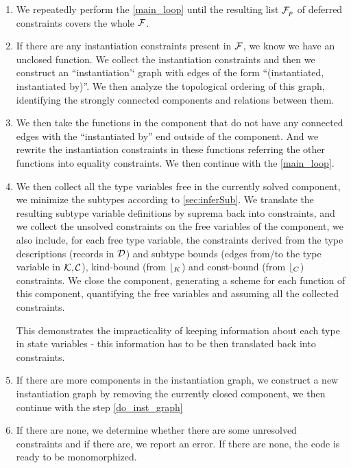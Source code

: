 \begin{enumerate}
    \item We repeatedly perform the \cref{main_loop} until the resulting list $\mathcal F_p$ of deferred constraints covers the whole $\mathcal{F}$.

    \item If there are any instantiation constraints present in $\mathcal F$, we know we have an unclosed function. We collect the instantiation constraints and then we construct an ``instantiation'` graph with edges of the form ``(instantiated, instantiated by)''. We then analyze the topological ordering of this graph, identifying the strongly connected components and relations between them.

    \item We then take the functions in the component that do not have any connected edges with the ``instantiated by'' end outside of the component. And we rewrite the instantiation constraints in these functions referring the other functions into equality constraints. We then continue with the \cref{main_loop}. \label{do_inst_graph}

    \item We then collect all the type variables free in the currently solved component, we minimize the subtypes according to \cref{sec:inferSub}. We translate the resulting subtype variable definitions by suprema back into constraints, and we collect the unsolved constraints on the free variables of the component, we also include, for each free type variable, the constraints derived from the type descriptions (records in $\mathcal{D}$) and subtype bounds (edges from/to the type variable in $\mathcal K, \mathcal C$), kind-bound (from $\mathcal b_K$) and const-bound (from $\mathcal b_C$) constraints. We close the component, generating a scheme for each function of this component, quantifying the free variables and assuming all the collected constraints. \label{closing}

    This demonstrates the impracticality of keeping information about each type in state variables - this information has to be then translated back into constraints.

    \item If there are more components in the instantiation graph, we construct a new instantiation graph by removing the currently closed component, we then continue with the step \ref{do_inst_graph}

    \item If there are none, we determine whether there are some unresolved constraints and if there are, we report an error. If there are none, the code is ready to be monomorphized.
\end{enumerate}

